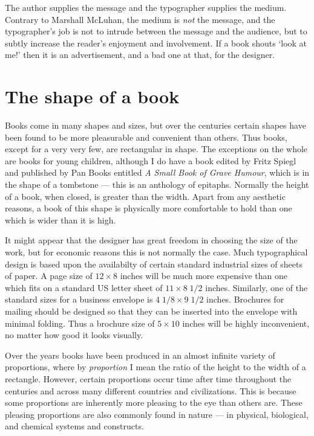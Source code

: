 \documentclass[10pt,letterpaper]{memoir}
\begin{document}
    The author supplies the message and the typographer supplies the medium.
Contrary to Marshall McLuhan, the medium is \emph{not} the message, 
and the typographer's job is not to
intrude between the message and the audience, but to subtly increase the
reader's enjoyment and involvement. If a book shouts `look at me!' then it
is an advertisement, and a bad one at that, for the designer.


\section{The shape of a book}

    Books come in many shapes and sizes, but over the centuries certain
shapes have been found to be more pleasurable and convenient than others.
Thus books, except for a very very few, are rectangular in shape. The 
exceptions on the whole are books for young children, although I do
have a book edited by Fritz Spiegl and published by Pan Books entitled
\textit{A Small Book of Grave Humour}, which is in the shape of a tombstone
--- this is an anthology of epitaphs. Normally the height of a book, when 
closed, is greater than the width. Apart from any aesthetic reasons, 
a book of this shape is physically more comfortable to hold than one which 
is wider than it is high.

    It might appear that the designer has great freedom in choosing the
size of the work, but for economic reasons this is not normally the case.
Much typographical design is based upon the availabilty of certain 
standard industrial sizes of sheets of paper. A page size of $12 \times 8$
inches will be much more expensive than one which fits on a standard
US letter sheet of $11 \times 8 \; 1/2$ inches. Similarly, 
one of the standard sizes
for a business envelope is $4 \; 1/8 \times 9 \; 1/2$ inches. 
Brochures for mailing
should be designed so that they can be inserted into the envelope with 
minimal folding. Thus a brochure size of $5 \times 10$ inches will be 
highly inconvenient, no matter how good it looks visually.

    Over the years books have been produced in an almost infinite variety
of proportions,
where by \emph{proportion} 
I mean the ratio of the height to the width of a
rectangle. However, certain proportions occur time after time throughout
the centuries and across many different countries and 
civilizations. This is because some proportions are inherently
more pleasing to the eye than others are. These pleasing proportions are
also commonly found in nature --- in  physical, biological, and chemical
systems and constructs. 
\end{document}
